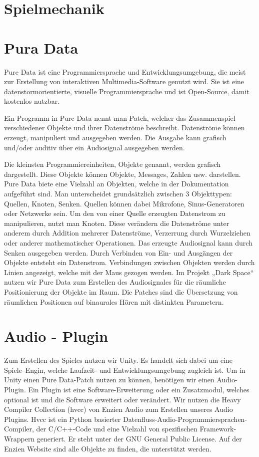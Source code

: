 \documentclass[a4paper, 11pt]{scrartcl}
\begin{document}
\section{Spielmechanik}
\label{sec:spielmechanik}

\section{Pura Data}
\label{sec:Pure Data}

Pure Data ist eine Programmiersprache und Entwicklungsumgebung, die meist zur Erstellung von interaktiven Multimedia-Software genutzt wird. Sie ist eine datenstormorientierte, visuelle Programmiersprache und ist Open-Source, damit kostenlos nutzbar.

Ein Programm in Pure Data nennt man Patch, welcher das Zusammenspiel verschiedener Objekte und ihrer Datenströme beschreibt. Datenströme können erzeugt, manipuliert und ausgegeben werden. Die Ausgabe kann grafisch und/oder auditiv über ein Audiosignal ausgegeben werden.  

Die kleinsten Programmiereinheiten, Objekte genannt, werden grafisch dargestellt. Diese Objekte können Objekte, Messages, Zahlen usw. darstellen. Pure Data biete eine Vielzahl an Objekten, welche in der Dokumentation aufgeführt sind. Man unterscheidet grundsätzlich zwischen 3 Objekttypen: Quellen, Knoten, Senken. Quellen können dabei Mikrofone, Sinus-Generatoren oder Netzwerke sein. Um den von einer Quelle erzeugten Datenstrom zu manipulieren, nutzt man Knoten. Diese verändern die Datenströme unter anderem durch Addition mehrerer Datenströme, Verzerrung durch Wurzelziehen oder anderer mathematischer Operationen. Das erzeugte Audiosignal kann durch Senken ausgegeben werden. Durch Verbinden von Ein- und Ausgängen der Objekte entsteht ein Datenstrom. Verbindungen zwischen Objekten werden durch Linien angezeigt, welche mit der Maus gezogen werden. 
Im Projekt „Dark Space“ nutzen wir Pure Data zum Erstellen des Audiosignales für die räumliche Positionierung der Objekte im Raum. Die Patches sind die Übersetzung von räumlichen Positionen auf binaurales Hören mit distinkten Parametern. 

\section{Audio - Plugin}
\label{sec:Audio - Plugin}

Zum Erstellen des Spieles nutzen wir Unity. Es handelt sich dabei um eine Spiele–Engin, welche Laufzeit- und Entwicklungsumgebung zugleich ist. Um in Unity einen Pure Data-Patch nutzen zu können, benötigen wir einen Audio-Plugin. Ein Plugin ist eine Software-Erweiterung oder ein Zusatzmodul, welches optional ist und die Software erweitert oder verändert. 
Wir nutzen die Heavy Compiler Collection (hvcc) von Enzien Audio zum Erstellen unseres Audio Plugins. 
Hvcc ist ein Python basierter Datenfluss-Audio-Programmiersprachen-Compiler, der C/C++-Code und eine Vielzahl von spezifischen Framework-Wrappern generiert. Er steht unter der GNU General Public License. Auf der Enzien Website sind alle Objekte zu finden, die unterstützt werden. 
\end{document}
